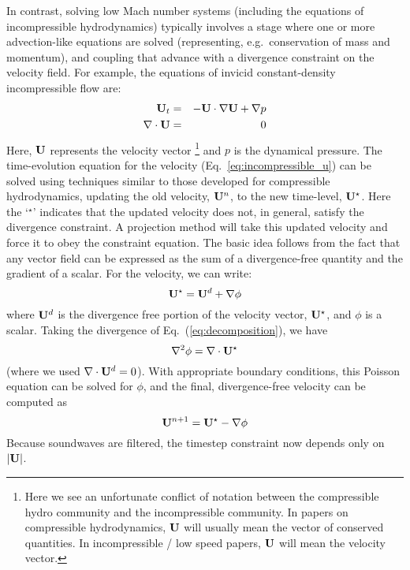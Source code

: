 In contrast, solving low Mach number systems (including the equations of
incompressible hydrodynamics) typically involves a stage where one or more
advection-like equations are solved (representing, e.g.\ conservation of mass and
momentum), and coupling that advance with a divergence constraint on the velocity field.
For example, the equations of invicid constant-density incompressible flow
are:
\begin{eqnarray}
{\bf U}_t &=& -{\bf U} \cdot \nabla {\bf U} + \nabla p \label{eq:incompressible_u} \\
\nabla \cdot {\bf U} &=& 0
\end{eqnarray}
Here, ${\bf U}$ represents the velocity vector%
%
\footnote{Here we see an unfortunate conflict
of notation between the compressible hydro community and the
incompressible community.  In papers on compressible hydrodynamics,
${\bf U}$ will usually mean the vector of conserved quantities.  In 
incompressible / low speed papers, ${\bf U}$ will mean the velocity vector.}
%
and $p$ is the dynamical pressure.  The time-evolution equation for
the velocity (Eq.~\ref{eq:incompressible_u}) can be solved using
techniques similar to those developed for compressible hydrodynamics,
updating the old velocity, ${\bf U}^n$, to the new time-level, ${\bf U}^\star$.
Here the `$^\star$' indicates that the updated velocity does not, in
general, satisfy the divergence constraint.  A projection method will
take this updated velocity and force it to obey the constraint
equation.  The basic idea follows from the fact that any vector
field can be expressed as the sum of a divergence-free quantity and
the gradient of a scalar.  For the velocity, we can write:
\begin{equation}
{\bf U}^\star = {\bf U}^d + \nabla \phi \label{eq:decomposition}
\end{equation}
where ${\bf U}^d$ is the divergence free portion of the velocity vector,
${\bf U}^\star$, and $\phi$ is a scalar.  Taking the divergence of
Eq.~(\ref{eq:decomposition}), we have
\begin{equation}
\nabla^2 \phi = \nabla \cdot {\bf U}^\star
\end{equation}
(where we used $\nabla \cdot {\bf U}^d = 0$).
With appropriate boundary conditions, this Poisson equation can be
solved for $\phi$, and the final, divergence-free velocity can 
be computed as
\begin{equation}
{\bf U}^{n+1} = {\bf U}^\star - \nabla \phi
\end{equation}
Because soundwaves are filtered, the timestep constraint now depends only
on $|{\bf U}|$.

